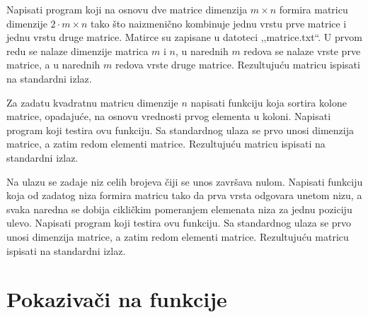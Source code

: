 \begin{Exercise}[label=342]
Napisati program koji na osnovu dve matrice dimenzija $m \times n$
formira matricu dimenzije $2 \cdot m \times n$ tako što
naizmenično kombinuje jednu vrstu prve matrice i jednu vrstu
druge matrice. Matirce su zapisane u datoteci ,,matrice.txt``. U
prvom redu se nalaze dimenzije matrica $m$ i $n$, u
narednih $m$ redova se nalaze vrste prve matrice, a u
narednih $m$ redova vrste druge matrice. Rezultujuću
matricu ispisati na standardni izlaz.
\end{Exercise}
\begin{Answer}[ref=342]
\end{Answer}

\begin{Exercise}[label=343]
Za zadatu kvadratnu matricu dimenzije $n$ napisati funkciju
koja sortira kolone matrice, opadajuće, na osnovu vrednosti
prvog elementa u koloni.
Napisati program koji testira ovu funkciju. Sa standardnog ulaza
se prvo unosi dimenzija matrice, a zatim redom elementi matrice.
Rezultujuću matricu ispisati na standardni izlaz.
\end{Exercise}
\begin{Answer}[ref=343]
\end{Answer}

\begin{Exercise}[label=344]
Na ulazu se zadaje niz celih brojeva čiji se unos završava nulom.
Napisati funkciju koja od zadatog niza formira matricu tako da
prva vrsta odgovara unetom nizu, a svaka naredna se dobija
cikličkim pomeranjem elemenata niza za jednu poziciju ulevo.
Napisati program koji testira ovu funkciju. Sa standardnog ulaza
se prvo unosi dimenzija matrice, a zatim redom elementi matrice.
Rezultujuću matricu ispisati na standardni izlaz.
\end{Exercise}
\begin{Answer}[ref=344]
\end{Answer}

\section{Pokazivači na funkcije}

